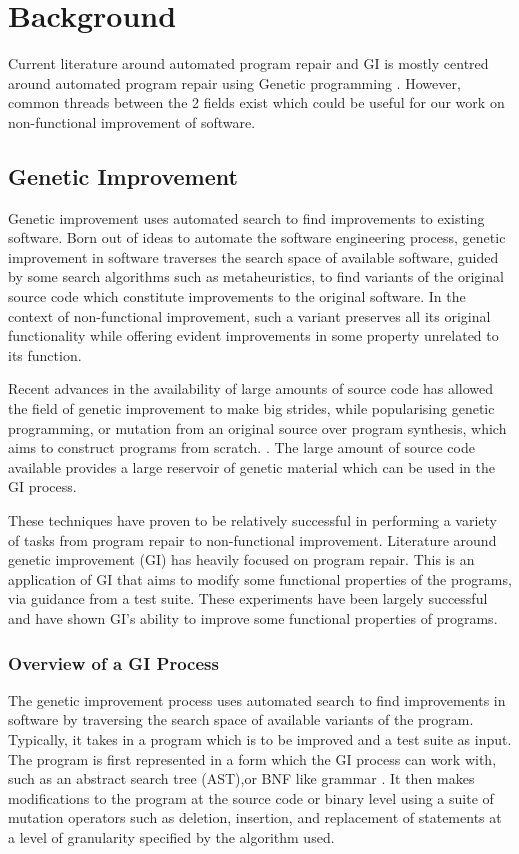 \documentclass[titlepage]{article}
\begin{document}
\section{Background}
Current literature around automated program repair and GI is mostly centred around automated program repair using Genetic programming \cite{petkesurvey}. However, common threads between the 2 fields exist which could be useful for our work on non-functional improvement of software.

\subsection{Genetic Improvement}
Genetic improvement uses automated search to find improvements to existing software\cite{petkesurvey}. Born out of ideas to automate the software engineering process, genetic improvement in software traverses the search space of available software, guided by some search algorithms such as metaheuristics, to find variants of the original source code which constitute improvements to the original software. In the context of non-functional improvement, such a variant preserves all its original functionality while offering evident improvements in some property unrelated to its function.

Recent advances in the availability of large amounts of source code has allowed the field of genetic improvement to make big strides, while popularising genetic programming, or mutation from an original source over program synthesis, which aims to construct programs from scratch. \cite{petkesurvey}. The large amount of source code available provides a large reservoir of genetic material which can be used in the GI process. 

These techniques have proven to be relatively successful in performing a variety of tasks from program repair to non-functional improvement.
Literature around genetic improvement (GI) has heavily focused on program repair. This is an application of GI that aims to modify some functional properties of the programs, via guidance from a test suite. These experiments have been largely successful \cite{cure,genprog} and have shown GI’s ability to improve some functional properties of programs.

\subsubsection{Overview of a GI Process}

The genetic improvement process uses automated search to find improvements in software by traversing the search space of available variants of the program. Typically, it takes in a program which is to be improved and a test suite as input. The program is first represented in a form which the GI process can work with, such as an abstract search tree (AST),or BNF like grammar \cite{langdonharman2015}. It then makes modifications to the program at the source code or binary level using a suite of mutation operators such as deletion, insertion, and replacement of statements at a level of granularity specified by the algorithm used. 
\end{document}

